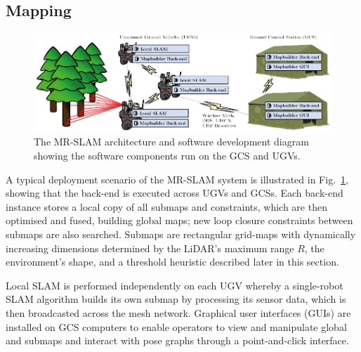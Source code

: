 
\subsection{Mapping}

\begin{figure}[H]
	\centering
	\includegraphics[width=\linewidth]{fig2}
	\caption[MR-SLAM architecture and software development diagram]{The MR-SLAM architecture and software development diagram showing the software components run on the GCS and UGVs.}
	\label{fig:4:mrslam}
\end{figure} 

A typical deployment scenario of the MR-SLAM system is illustrated in Fig.~\ref{fig:4:mrslam}, showing that the back-end is executed across UGVs and GCSs. Each back-end instance stores a local copy of all submaps and constraints, which are then optimised and fused, building global maps; new loop closure constraints between submaps are also searched. Submaps are rectangular grid-maps with dynamically increasing dimensions determined by the LiDAR's maximum range $R$, the environment's shape, and a threshold heuristic described later in this section.

Local SLAM is performed independently on each UGV whereby a single-robot SLAM algorithm builds its own submap by processing its sensor data, which is then broadcasted across the mesh network. Graphical user interfaces (GUIs) are installed on GCS computers to enable operators to view and manipulate global and submaps and interact with pose graphs through a point-and-click interface.


